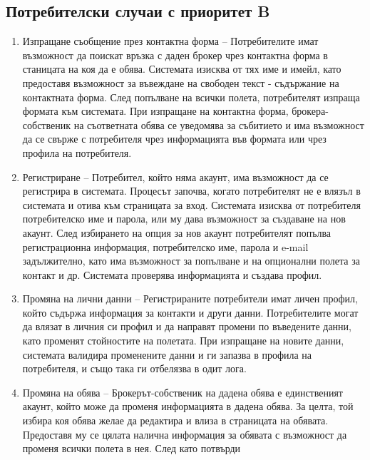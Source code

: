 \documentclass[a4paper]{article}
\begin{document}
\subsection{Потребителски случаи с приоритет B}
\begin{enumerate}
\renewcommand{\theenumi}{B-\arabic{enumi}}

\item {Изпращане съобщение през контактна форма --
        Потребителите имат възможност да поискат връзка с даден брокер чрез
        контактна форма в станицата на коя да е обява. Системата изисква от тях име и
        имейл, като предоставя възможност за въвеждане на свободен текст - съдържание
        на контактната форма. След попълване на всички полета, потребителят изпраща 
        формата към системата. При изпращане на контактна форма, брокера-собственик
        на съответната обява се уведомява за събитието и има възможност да се свърже
        с потребителя чрез информацията във формата или чрез профила на потребителя.
}
\item {Регистриране --
        Потребител, който няма акаунт, има възможност да се регистрира в системата.
        Процесът започва, когато потребителят не е влязъл в системата и отива към
        страницата за вход. Системата изисква от потребителя потребителско име и
        парола, или му дава възможност за създаване на нов акаунт. След избирането
        на опция за нов акаунт потребителят попълва регистрационна информация, 
        потребителско име, парола и e-mail задължително, като има възможност за попълване и
        на опционални полета за контакт и др. Системата проверява информацията и създава
        профил.
}
\item {Промяна на лични данни --
        Регистрираните потребители имат личен профил, който съдържа информация за
        контакти и други данни. Потребителите могат да влязат в личния си профил и
        да направят промени по въведените данни, като променят стойностите на полетата.
        При изпращане на новите данни, системата валидира променените данни и ги запазва
        в профила на потребителя, и също така ги отбелязва в одит лога.
}
\item {Промяна на обява --
        Брокерът-собственик на дадена обява е единственият акаунт, който може да променя
        информацията в дадена обява. За целта, той избира коя обява желае да редактира
        и влиза в страницата на обявата. Предоставя му се цялата налична информация
        за обявата с възможност да променя всички полета в нея. След като потвърди
}
\end{enumerate}
\end{document}
